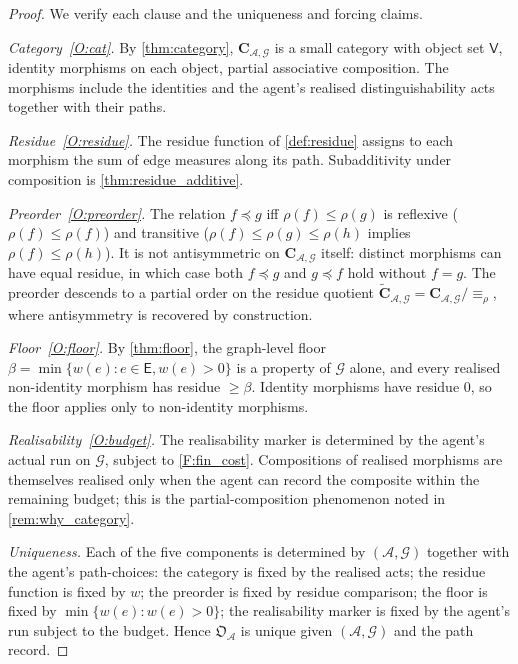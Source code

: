 \documentclass[11pt,a4paper]{article}
\theoremstyle{thmstyle}
\theoremstyle{definition}
\theoremstyle{remark}
\newcommand{\Graph}{\mathcal{G}}
\newcommand{\Vrt}{\mathsf{V}}
\newcommand{\Edg}{\mathsf{E}}
\newcommand{\Agent}{\mathcal{A}}
\newcommand{\Res}{\rho}
\newcommand{\floor}{\beta}
\newcommand{\OpStr}{\mathfrak{O}}
\begin{document}
\begin{proof}
We verify each clause and the uniqueness and forcing claims.

\emph{Category~\ref{O:cat}.} By \cref{thm:category},
$\mathbf{C}_{\Agent,\Graph}$ is a small category with object set
$\Vrt$, identity morphisms on each object, partial associative
composition. The morphisms include the identities and the
agent's realised distinguishability acts together with their paths.

\emph{Residue~\ref{O:residue}.} The residue function of
\cref{def:residue} assigns to each morphism the sum of edge
measures along its path. Subadditivity under composition is
\cref{thm:residue_additive}.

\emph{Preorder~\ref{O:preorder}.} The relation $f \preceq g$ iff
$\Res(f) \leq \Res(g)$ is reflexive ($\Res(f) \leq \Res(f)$) and
transitive ($\Res(f) \leq \Res(g) \leq \Res(h)$ implies
$\Res(f) \leq \Res(h)$). It is not antisymmetric on
$\mathbf{C}_{\Agent,\Graph}$ itself: distinct morphisms can have
equal residue, in which case both $f \preceq g$ and $g \preceq f$
hold without $f = g$. The preorder descends to a partial order on
the residue quotient
$\widetilde{\mathbf{C}}_{\Agent,\Graph} = \mathbf{C}_{\Agent,
\Graph}/\!\equiv_\Res$, where antisymmetry is recovered by
construction.

\emph{Floor~\ref{O:floor}.} By \cref{thm:floor}, the graph-level
floor $\floor = \min\{w(e) : e \in \Edg, w(e) > 0\}$ is a property
of $\Graph$ alone, and every realised non-identity morphism has
residue $\geq \floor$. Identity morphisms have residue $0$, so the
floor applies only to non-identity morphisms.

\emph{Realisability~\ref{O:budget}.} The realisability marker is
determined by the agent's actual run on $\Graph$, subject to
\cref{F:fin_cost}. Compositions of realised morphisms are
themselves realised only when the agent can record the composite
within the remaining budget; this is the partial-composition
phenomenon noted in \cref{rem:why_category}.

\emph{Uniqueness.} Each of the five components is determined by
$(\Agent, \Graph)$ together with the agent's path-choices: the
category is fixed by the realised acts; the residue function is
fixed by $w$; the preorder is fixed by residue comparison; the
floor is fixed by $\min\{w(e) : w(e) > 0\}$; the realisability
marker is fixed by the agent's run subject to the budget. Hence
$\OpStr_\Agent$ is unique given $(\Agent, \Graph)$ and the path
record.


\end{proof}
\end{document}
